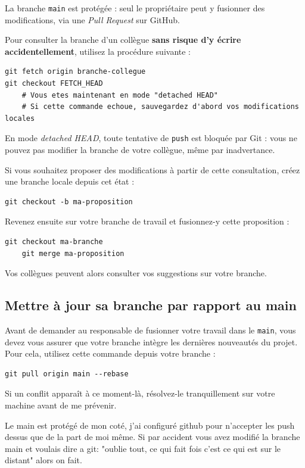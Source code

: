 \documentclass[11pt,a4paper]{article}
\begin{document}
La branche \texttt{main} est protégée : seul le propriétaire peut y fusionner des modifications, 
via une \textit{Pull Request} sur GitHub.

Pour consulter la branche d'un collègue \textbf{sans risque d'y écrire accidentellement}, 
utilisez la procédure suivante :

\begin{lstlisting}[style=bashstyle]
git fetch origin branche-collegue
git checkout FETCH_HEAD
	# Vous etes maintenant en mode "detached HEAD"
	# Si cette commande echoue, sauvegardez d'abord vos modifications locales
\end{lstlisting}

En mode \textit{detached HEAD}, toute tentative de \texttt{push} est bloquée par Git : 
vous ne pouvez pas modifier la branche de votre collègue, même par inadvertance.

Si vous souhaitez proposer des modifications à partir de cette consultation, 
créez une branche locale depuis cet état :

\begin{lstlisting}[style=bashstyle]
	git checkout -b ma-proposition
\end{lstlisting}

Revenez ensuite sur votre branche de travail et fusionnez-y cette proposition :

\begin{lstlisting}[style=bashstyle]
	git checkout ma-branche
	git merge ma-proposition
\end{lstlisting}

Vos collègues peuvent alors consulter vos suggestions sur votre branche. 

\subsection*{Mettre à jour sa branche par rapport au main}
Avant de demander au responsable de fusionner votre travail dans le \texttt{main}, vous devez vous assurer que votre branche intègre les dernières nouveautés du projet. Pour cela, utilisez cette commande depuis votre branche :
\begin{lstlisting}[style=bashstyle]
git pull origin main --rebase
\end{lstlisting}
Si un conflit apparaît à ce moment-là, résolvez-le tranquillement sur votre machine avant de me prévenir.

Le main est protégé de mon coté, j'ai configuré github pour n'accepter les push dessus que de la part de moi même. Si par accident vous avez modifié la branche main et voulais dire a git: "oublie tout, ce qui fait fois c'est ce qui est sur le distant" alors on fait. 
\end{document}
